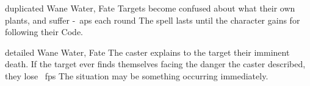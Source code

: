   {duplicated}%
  {Wane}%
  {Water, Fate}%
  {}%
  {Targets become confused about what their own plants, and suffer -~\glspl{ap} each round}%
  {The spell lasts until the character gains  for following their Code.}

  {detailed}%
  {Wane}%
  {Water, Fate}%
  {}%
  {The caster explains to the target their imminent death.
    If the target ever finds themselves facing the danger the caster described, they lose \showDam~\glspl{fp}}%
  {The situation may be something occurring immediately.}
